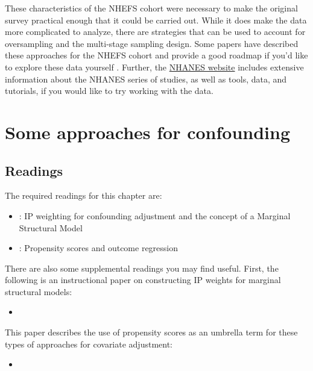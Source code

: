 \documentclass[
]{book}
\providecommand{\tightlist}{%
  \setlength{\itemsep}{0pt}\setlength{\parskip}{0pt}}
\begin{document}
These characteristics of the NHEFS cohort were necessary to make the original survey practical enough that it could be carried out. While it does make the data more complicated to analyze, there are strategies that can be used to account for oversampling and the multi-stage sampling design. Some papers have described these approaches for the NHEFS cohort and provide a good roadmap if you'd like to explore these data yourself \citep{korn1991epidemiologic, ingram1994statistical}. Further, the \href{https://www.cdc.gov/nchs/nhanes/index.htm}{NHANES website} includes extensive information about the NHANES series of studies, as well as tools, data, and tutorials, if you would like to try working with the data.

\hypertarget{some-approaches-for-confounding}{%
\chapter{Some approaches for confounding}\label{some-approaches-for-confounding}}

\hypertarget{readings-5}{%
\section{Readings}\label{readings-5}}

The required readings for this chapter are:

\begin{itemize}
\item
  \citet{hernanch12}: IP weighting for confounding adjustment and the concept of a Marginal Structural Model
\item
  \citet{hernanch15}: Propensity scores and outcome regression
\end{itemize}

There are also some supplemental readings you may find useful. First, the following is an instructional paper on constructing IP weights for marginal structural models:

\begin{itemize}
\tightlist
\item
  \citet{cole2008constructing}
\end{itemize}

This paper describes the use of propensity scores as an umbrella term for these types of approaches for covariate adjustment:

\begin{itemize}
\tightlist
\item
  \citet{brookhart2013propensity}
\end{itemize}
\end{document}

